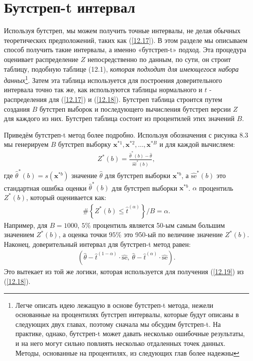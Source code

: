 \section{Бутстреп-t интервал}
Используя бутстреп, мы можем получить точные интервалы, не делая обычных теоретических предположений, таких как (\ref{12.17}). В этом разделе мы описываем способ получить такие интервалы, а именно «бутстреп-t» подход. Эта процедура оценивает распределение $Z$ непосредственно по данным, по сути, он строит таблицу, подобную таблице (12.1), \textit{которая подходит для имеющегося набора данных}\footnote{Легче описать идею лежащую в основе бутстреп-t метода, нежели основанные на процентилях бутстреп интервалы, которые будут описаны в следующих двух главах, поэтому сначала мы обсудим бутстреп-t. На практике, однако, бутстреп-t может давать несколько ошибочные результаты, и на него могут сильно повлиять несколько отдаленных точек данных. Методы, основанные на процентилях, из следующих глав более надежны}. Затем эта таблица используется для построения доверительного интервала точно так же, как используются таблицы нормального и $t$ - распределения для (\ref{12.17}) и (\ref{12.18}). Бутстреп таблица строится путем создания $B$ бутстреп выборок и последующего вычисления бутстреп версии $Z$ для каждого из них. Бутстреп таблица состоит из процентилей этих значений $B$.

Приведём бутстреп-t метод более подробно. Используя обозначения с рисунка 8.3 мы генерируем $B$ бутстреп выборку $\textbf{x}^{*1},\textbf{x}^{*2},\ldots, \textbf{x}^{*B}$ и для каждой вычисляем:
\begin{gather}\label{12.20}
Z^{*}(b) = \frac{\widehat{\theta}^{*}(b) - \widehat{\theta}}{\widehat{\text{se}}^{*}(b)},
\end{gather}
где $\widehat{\theta}^{*}(b) = s(\textbf{x}^{*b})$ значение $\widehat{\theta}$ для бутстреп выборки $\textbf{x}^{*b}$, а $\widehat{\text{se}}^{*}(b)$ это стандартная ошибка оценки $\widehat{\theta}^{*}(b)$ для бутстреп выборки $\textbf{x}^{*b}$. $\alpha$ процентиль $Z^{*}(b)$, который оценивается как:
\begin{gather}\label{12.21}
\# \left\{Z^{*}(b)\le \widehat{t}^{(\alpha)} \right\} / B = \alpha.
\end{gather}
Например, для $B = 1000$, $5 \%$ процентиль является 50-ым самым большим значением $Z^{*}(b)$, а оценка точки $95 \%$ это 950-ый по величине значение $Z^{*}(b)$. Наконец, доверительный интервал для бутстреп-t метод равен:
\begin{gather}\label{12.22}
( \hat{\theta} - \widehat{t}^{(1 - \alpha)} \cdot \widehat{\text{se}}, \ \widehat{\theta} - \widehat{t}^{(\alpha)} \cdot \widehat{\text{se}}).
\end{gather}
Это вытекает из той же логики, которая используется для получения (\ref{12.19}) из (\ref{12.18}).

